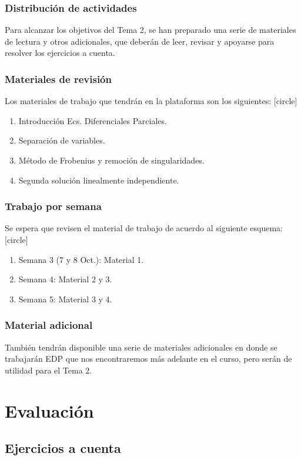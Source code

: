 \documentclass[12pt]{beamer}
\begin{document}
\begin{frame}
\frametitle{Distribución de actividades}
Para alcanzar los objetivos del Tema 2, se han preparado una serie de materiales de lectura y otros adicionales, que deberán de leer, revisar y apoyarse para resolver los ejercicios a cuenta.
\end{frame}
\begin{frame}
\frametitle{Materiales de revisión}
Los materiales de trabajo que tendrán en la plataforma son los siguientes:
[circle]
\begin{enumerate}[<+->]
\item Introducción Ecs. Diferenciales Parciales.
\item Separación de variables.
\item Método de Frobenius y remoción de singularidades.
\item Segunda solución linealmente independiente.
\end{enumerate}
\end{frame}
\begin{frame}
\frametitle{Trabajo por semana}
Se espera que revisen el material de trabajo de acuerdo al siguiente esquema:
[circle]
\begin{enumerate}[<+->]
\item Semana 3 (7 y 8 Oct.): Material 1.
\item Semana 4: Material 2 y 3.
\item Semana 5: Material 3 y 4.
\end{enumerate}
\end{frame}
\begin{frame}
\frametitle{Material adicional}
También tendrán disponible una serie de materiales adicionales en donde se trabajarán EDP que nos encontraremos más adelante en el curso, pero serán de utilidad para el Tema 2.
\end{frame}

\section{Evaluación}
\subsection{Ejercicios a cuenta}
\end{document}
